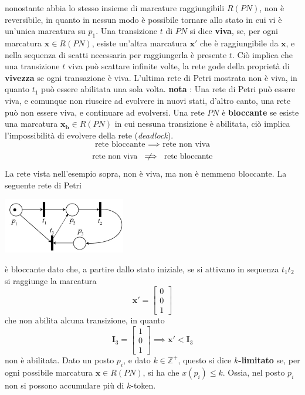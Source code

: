 \documentclass[10pt, letterpaper]{report}
\begin{document}
nonostante abbia lo stesso insieme di marcature raggiungibili $R(PN)$, non è reversibile, in quanto in nessun modo è possibile tornare allo stato in cui vi è un'unica marcatura su $p_1$.
\acc 
{} Una transizione $t$ di $PN$ si dice \textbf{viva}, se, per ogni marcatura $\mathbf{x}\in R(PN)$, esiste un'altra marcatura $\mathbf{x'}$ che è raggiungibile da $\mathbf{x}$, e nella sequenza di scatti necessaria per raggiungerla è presente $t$.\acc 
Ciò implica che una transizione $t$ viva può scattare infinite volte, la rete gode della proprietà di \textbf{vivezza} se ogni transazione è viva. L'ultima  rete di Petri mostrata non è viva, in quanto $t_1$ può essere abilitata una sola volta.\acc 
\textbf{nota} : Una rete di Petri può essere viva, e comunque non riuscire ad evolvere in nuovi stati, d'altro canto, una rete può non essere viva, e continuare ad evolversi.\acc 
{} Una rete $PN$ è \textbf{bloccante} se esiste una marcatura $\mathbf{x_b}\in R(PN)$ in cui nessuna transizione è abilitata, ciò implica l'impossibilità di evolvere della rete (\textit{deadlock}).
$$\text{ rete bloccante } \implies \text{ rete non viva } $$
$$\text{ rete non viva } \notimplies \text{ rete bloccante } $$
La rete vista nell'esempio sopra, non è viva, ma non è nemmeno bloccante. \acc 
La seguente rete di Petri
\begin{center}
    \includegraphics[width=0.4\textwidth]{images/bloccante.png}
\end{center}
è bloccante dato che, a partire dallo stato iniziale, se si attivano in sequenza $t_1t_2$ si raggiunge la marcatura 
$$\mathbf x' = \begin{bmatrix}
    0\\0\\1
\end{bmatrix}$$ 
che non abilita alcuna transizione, in quanto $$\mathbf I_3=\begin{bmatrix}
    1\\ 0 \\ 1
\end{bmatrix}\implies \mathbf x' < \mathbf I_3$$
non è abilitata. 
\acc 
{} Dato un posto $p_i$, e dato $k\in\mathbb{Z^+}$, questo si dice $k$\textbf{-limitato} se, per ogni possibile marcatura $\mathbf x\in R(PN)$, si ha che $x(p_i)\le k$. Ossia, nel posto $p_i$ non si possono accumulare più di $k$-token.
\end{document}
